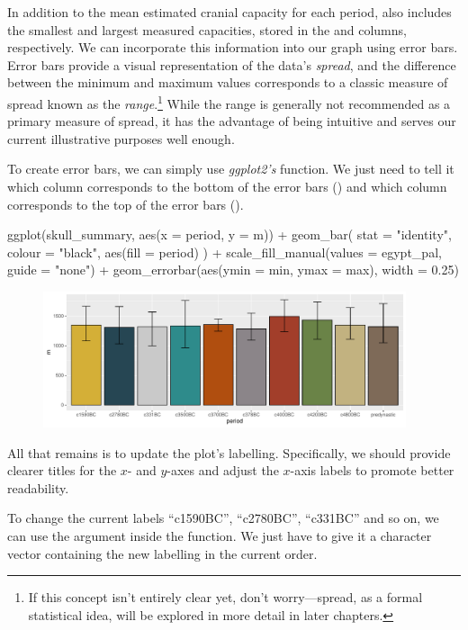 In addition to the mean estimated cranial capacity for each period,  also includes the smallest and largest measured capacities, stored in the  and  columns, respectively. We can incorporate this information into our graph using \glspl{error bar}. Error bars provide a visual representation of the data's \textit{spread}, and the difference between the minimum and maximum values corresponds to a classic measure of spread known as the \textit{range}.\footnote{If this concept isn’t entirely clear yet, don’t worry—spread, as a formal statistical idea, will be explored in more detail in later chapters.} While the range is generally not recommended as a primary measure of spread, it has the advantage of being intuitive and serves our current illustrative purposes well enough.

To create error bars, we can simply use \textit{ggplot2's}  function. We just need to tell it which column corresponds to the bottom of the error bars () and which column corresponds to the top of the error bars ().

\begin{inR}
ggplot(skull_summary, aes(x = period, y = m)) +
  geom_bar(
    stat = "identity",
    colour = "black",
    aes(fill = period)
  ) +
  scale_fill_manual(values = egypt_pal, guide = "none") +
  geom_errorbar(aes(ymin = min, ymax = max), width = 0.25)
\end{inR}

\vspace{2em}

\begin{figure}[H]
\includegraphics[width = 0.95\textwidth]{graphics/ch3Figs/bar_4.pdf}
\end{figure}

All that remains is to update the plot’s labelling. Specifically, we should provide clearer titles for the $x$- and $y$-axes and adjust the $x$-axis labels to promote better readability.

To change the current labels ``c1590BC'', ``c2780BC'', ``c331BC'' and so on, we can use the  argument inside the  function. We just have to give it a character vector containing the new labelling in the current order.


